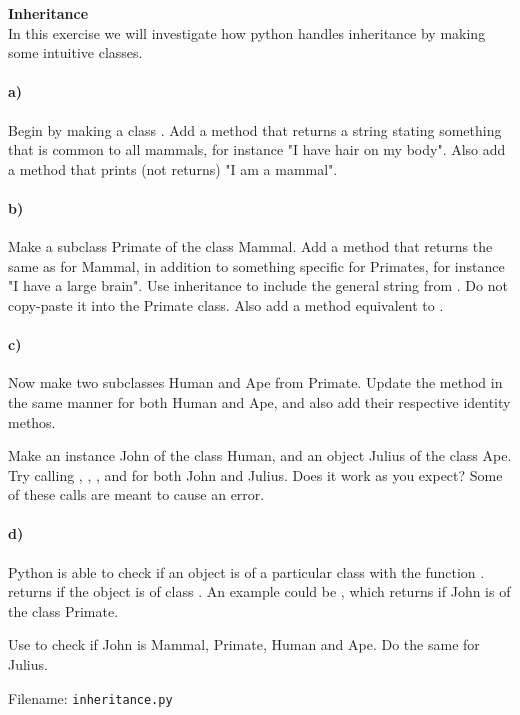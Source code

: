 \begin{Problem}{\textbf{Inheritance}} \label{prob94}
\\
In this exercise we will investigate how python handles inheritance by making some intuitive classes.

\paragraph{a)}
Begin by making a class . Add a
method  that returns a string stating
something that is common to all mammals, for instance "I have hair on my body".
Also add a method  that prints (not returns)
"I am a mammal".

\paragraph{b)}
Make a subclass Primate of the class Mammal. Add a method 
that returns the same as  for Mammal, in addition to
something specific for Primates, for instance "I have a large brain". Use inheritance
to include the general string from . Do not copy-paste it
into the Primate class. Also add a method
 equivalent to .

\paragraph{c)}
Now make two subclasses Human and Ape from Primate. Update the 
method in the same manner for both Human and Ape, and also add their respective
identity methos.

Make an instance John of the class Human, and an object Julius of the class Ape.
Try calling , ,
,   and  for both John and Julius. Does it work as you expect? Some of these calls are meant to cause an error.
\paragraph{d)}
Python is able to check if an object is of a particular class with the function .
 returns  if the object  is of class . An example could be
, which returns  if John is of the class Primate.


Use  to check if John is Mammal, Primate, Human and Ape. Do the same for Julius.

Filename: \texttt{inheritance.py}
\end{Problem}
